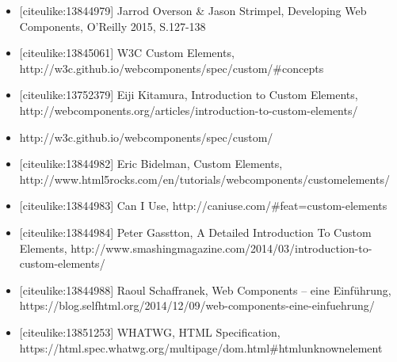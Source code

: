 \begin{itemize}
\tightlist
\item
  {[}citeulike:13844979{]} Jarrod Overson \& Jason Strimpel, Developing
  Web Components, O'Reilly 2015, S.127-138
\item
  {[}citeulike:13845061{]} W3C Custom Elements,
  http://w3c.github.io/webcomponents/spec/custom/\#concepts
\item
  {[}citeulike:13752379{]} Eiji Kitamura, Introduction to Custom
  Elements,
  http://webcomponents.org/articles/introduction-to-custom-elements/
\item
  http://w3c.github.io/webcomponents/spec/custom/
\item
  {[}citeulike:13844982{]} Eric Bidelman, Custom Elements,
  http://www.html5rocks.com/en/tutorials/webcomponents/customelements/
\item
  {[}citeulike:13844983{]} Can I Use,
  http://caniuse.com/\#feat=custom-elements
\item
  {[}citeulike:13844984{]} Peter Gasstton, A Detailed Introduction To
  Custom Elements,
  http://www.smashingmagazine.com/2014/03/introduction-to-custom-elements/
\item
  {[}citeulike:13844988{]} Raoul Schaffranek, Web Components -- eine
  Einführung,
  https://blog.selfhtml.org/2014/12/09/web-components-eine-einfuehrung/
\item
  {[}citeulike:13851253{]} WHATWG, HTML Specification,
  https://html.spec.whatwg.org/multipage/dom.html\#htmlunknownelement
\end{itemize}
